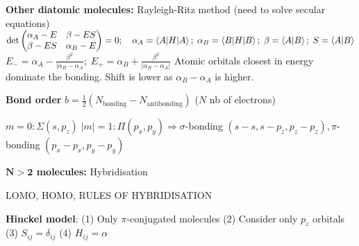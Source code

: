 \squishline

\begin{squishlist}
    \item \textbf{Other diatomic molecules:} Rayleigh-Ritz method (need to solve secular equations)\\
    $\det \begin{pmatrix}
        \alpha_A - E & \beta - ES \\
        \beta - ES   & \alpha_B - E
    \end{pmatrix} = 0; \quad \alpha_A = \braket{A|H|A};\; \alpha_B = \braket{B|H|B};\; \beta = \braket{A|B};\; S = \braket{A|B}$ \\
    $E_- = \alpha_A - \frac{\beta^2}{|\alpha_B - \alpha_A};\; E_+ = \alpha_B + \frac{\beta^2}{|\alpha_B - \alpha_A|}$ Atomic orbitals closest in energy dominate the bonding. Shift is lower as $\alpha_B - \alpha_A$ is higher.

    \item \textbf{Bond order} $b = \frac{1}{2} (N_{\text{bonding}} - N_{\text{antibonding}})$ ($N$ nb of electrons)
    
    \item $m=0 : \Sigma (s, p_z) \; |m|=1 : \Pi (p_x, p_y) \Longrightarrow \sigma$-bonding $(s-s, s-p_z, p_z-p_z), \pi$-bonding $(p_x-p_x, p_y-p_y)$
\end{squishlist}

\squishline

\begin{squishlist}
    \item \textbf{$\mathbf{N>2}$ molecules:} Hybridisation
    \item LOMO, HOMO, RULES OF HYBRIDISATION
    \item \textbf{Hinckel model}: (1) Only $\pi$-conjugated molecules (2) Consider only $p_z$ orbitals (3) $S_{ij} = \delta_{ij}$ (4) $H_{ij} = \alpha$
\end{squishlist}

